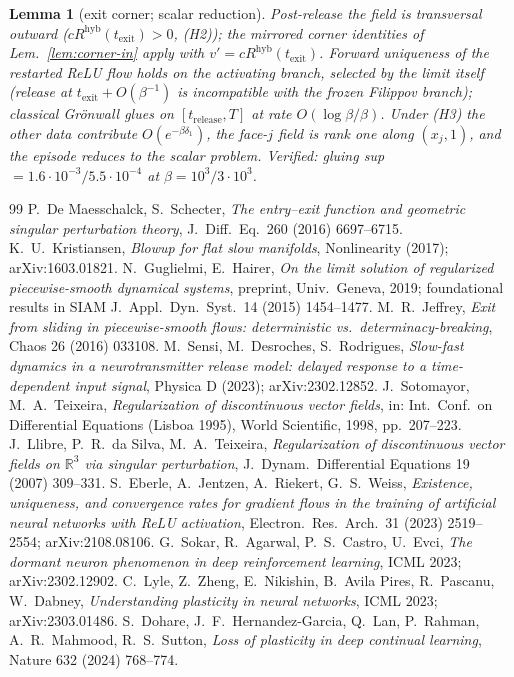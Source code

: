 \documentclass[11pt]{article}
\newtheorem{lemma}{Lemma}
\newcommand{\texit}{t_{\mathrm{exit}}}
\newcommand{\trel}{t_{\mathrm{release}}}
\begin{document}
\begin{lemma}[exit corner; scalar reduction]\label{lem:corner-out}
Post-release the field is transversal outward ($cR^{\mathrm{hyb}}(\texit)>0$,
(H2)); the mirrored corner identities of Lem.~\ref{lem:corner-in} apply with
$v'=cR^{\mathrm{hyb}}(\texit)$. Forward uniqueness of the restarted ReLU flow
holds on the \emph{activating branch}, selected by the limit itself (release at
$\texit+O(\beta^{-1})$ is incompatible with the frozen Filippov branch);
classical Gr\"onwall glues on $[\trel,T]$ at rate $O(\log\beta/\beta)$. Under (H3)
the other data contribute $O(e^{-\beta\delta_1})$, the face-$j$ field is rank one
along $(x_j,1)$, and the episode reduces to the scalar problem. Verified: gluing
sup $=1.6\cdot10^{-3}/5.5\cdot10^{-4}$ at $\beta=10^3/3\cdot10^3$.
\end{lemma}

\begin{thebibliography}{99}
 P.~De Maesschalck, S.~Schecter, \emph{The entry--exit function
and geometric singular perturbation theory}, J.~Diff.~Eq.\ 260 (2016) 6697--6715.
 K.~U.~Kristiansen, \emph{Blowup for flat slow manifolds},
Nonlinearity (2017); arXiv:1603.01821.
 N.~Guglielmi, E.~Hairer, \emph{On the limit solution of regularized
piecewise-smooth dynamical systems}, preprint, Univ.\ Geneva, 2019; foundational
results in SIAM J.~Appl.~Dyn.~Syst.\ 14 (2015) 1454--1477.
 M.~R.~Jeffrey, \emph{Exit from sliding in piecewise-smooth flows:
deterministic vs.\ determinacy-breaking}, Chaos 26 (2016) 033108.
 M.~Sensi, M.~Desroches, S.~Rodrigues, \emph{Slow-fast dynamics in
a neurotransmitter release model: delayed response to a time-dependent input
signal}, Physica D (2023); arXiv:2302.12852.
 J.~Sotomayor, M.~A.~Teixeira, \emph{Regularization of
discontinuous vector fields}, in: Int.\ Conf.\ on Differential Equations
(Lisboa 1995), World Scientific, 1998, pp.~207--223.
 J.~Llibre, P.~R.~da Silva, M.~A.~Teixeira, \emph{Regularization of
discontinuous vector fields on $\mathbb{R}^3$ via singular perturbation},
J.~Dynam.~Differential Equations 19 (2007) 309--331.
 S.~Eberle, A.~Jentzen, A.~Riekert, G.~S.~Weiss, \emph{Existence,
uniqueness, and convergence rates for gradient flows in the training of
artificial neural networks with ReLU activation}, Electron.~Res.~Arch.\ 31 (2023)
2519--2554; arXiv:2108.08106.
 G.~Sokar, R.~Agarwal, P.~S.~Castro, U.~Evci, \emph{The dormant
neuron phenomenon in deep reinforcement learning}, ICML 2023; arXiv:2302.12902.
 C.~Lyle, Z.~Zheng, E.~Nikishin, B.~Avila Pires, R.~Pascanu,
W.~Dabney, \emph{Understanding plasticity in neural networks}, ICML 2023;
arXiv:2303.01486.
 S.~Dohare, J.~F.~Hernandez-Garcia, Q.~Lan, P.~Rahman,
A.~R.~Mahmood, R.~S.~Sutton, \emph{Loss of plasticity in deep continual
learning}, Nature 632 (2024) 768--774.
\end{thebibliography}
\end{document}
